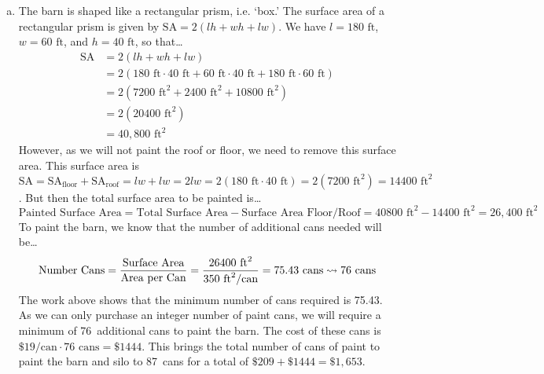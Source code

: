 \documentclass[11pt,letterpaper]{article}
\begin{document}
\begin{enumerate}[(a)]
\item The barn is shaped like a rectangular prism, i.e. `box.' The surface area of a rectangular prism is given by $\text{SA}= 2(lh + wh + lw)$. We have $l = 180 \text{ ft}$, $w= 60 \text{ ft}$, and $h= 40 \text{ ft}$, so that\dots
	\[
	\begin{aligned}
	\text{SA}&= 2(lh + wh + lw) \\
	&= 2 (180 \text{ ft} \cdot 40 \text{ ft} + 60 \text{ ft} \cdot 40 \text{ ft} + 180 \text{ ft} \cdot 60 \text{ ft} ) \\
	&= 2 (7200 \text{ ft}^2 + 2400 \text{ ft}^2 + 10800 \text{ ft}^2) \\
	&= 2(20400 \text{ ft}^2) \\
	&= 40,\!800 \text{ ft}^2
	\end{aligned}
	\]
However, as we will not paint the roof or floor, we need to remove this surface area. This surface area is $\text{SA}= \text{SA}_{\text{floor}} + \text{SA}_{\text{roof}}= lw + lw= 2lw= 2 (180 \text{ ft} \cdot 40 \text{ ft})= 2(7200 \text{ ft}^2)= 14400 \text{ ft}^2$. But then the total surface area to be painted is\dots
	\[
	\text{Painted Surface Area}= \text{Total Surface Area} - \text{Surface Area Floor/Roof}= 40800 \text{ ft}^2 - 14400 \text{ ft}^2= 26,\!400 \text{ ft}^2
	\]
To paint the barn, we know that the number of additional cans needed will be\dots
	\[
	\text{Number Cans}= \frac{\text{Surface Area}}{\text{Area per Can}}= \frac{26400 \text{ ft}^2}{350 \text{ ft}^2/\text{can}}= 75.43 \text{ cans} \rightsquigarrow 76 \text{ cans}
	\]
The work above shows that the minimum number of cans required is 75.43. As we can only purchase an integer number of paint cans, we will require a minimum of 76~additional cans to paint the barn. The cost of these cans is $\$19/\text{can} \cdot 76 \text{ cans}= \$1444$. This brings the total number of cans of paint to paint the barn and silo to 87~cans for a total of $\$209 + \$1444= \$1,\!653$. 
\end{enumerate} \vfill
\end{document}
